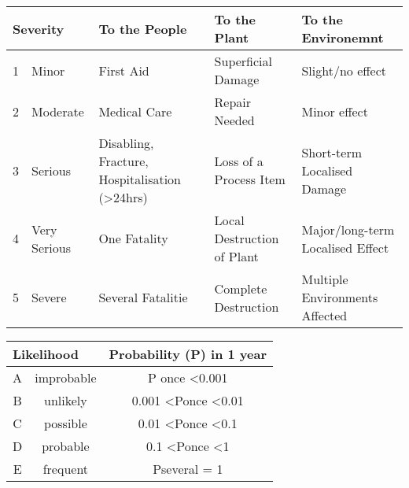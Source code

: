 \begin{tabularx}{\linewidth}{@{}llXXX@{}}
\toprule
\multicolumn{2}{l}{\textbf{Severity}} & \textbf{To the People}                                     & \textbf{To the Plant}      & \textbf{To the Environemnt}      \\ \midrule
1          & Minor             & First Aid                                                  & Superficial Damage         & Slight/no effect                 \\
2          & Moderate          & Medical Care                                               & Repair Needed              & Minor effect                     \\
3          & Serious           & Disabling, Fracture, Hospitalisation (\textgreater{}24hrs) & Loss of a Process Item     & Short-term Localised Damage      \\
4          & Very Serious      & One Fatality                                               & Local Destruction of Plant & Major/long-term Localised Effect \\
5          & Severe            & Several Fatalitie                                          & Complete Destruction       & Multiple Environments Affected   \\ \bottomrule
\end{tabularx}

\begin{tabular}{@{}ccc@{}}
\toprule
\multicolumn{2}{l}{Likelihood} & Probability (P) in 1 year              \\ \midrule
A & improbable & P once \textless   0.001               \\
B & unlikely   & 0.001 \textless Ponce   \textless 0.01 \\
C & possible   & 0.01 \textless Ponce   \textless 0.1   \\
D & probable   & 0.1 \textless Ponce   \textless 1      \\
E & frequent   & Pseveral   = 1                         \\ \bottomrule
\end{tabular}
